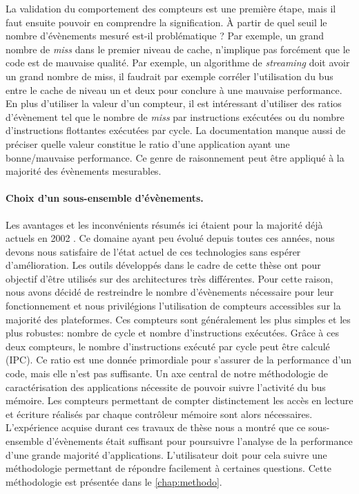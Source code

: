        La validation du comportement des compteurs est une première étape, mais il faut ensuite pouvoir en comprendre la signification. À partir de quel seuil le nombre d'évènements mesuré est-il problématique ? Par exemple, un grand nombre de \textit{miss} dans le premier niveau de cache, n'implique pas forcément que le code est de mauvaise qualité. Par exemple, un algorithme de \textit{streaming} doit avoir un grand nombre de miss, il faudrait par exemple corréler l'utilisation du bus entre le cache de niveau un et deux pour conclure à une mauvaise performance. En plus d'utiliser la valeur d'un compteur, il est intéressant d'utiliser des ratios d'évènement tel que le nombre de \textit{miss} par instructions exécutées ou du nombre d'instructions flottantes exécutées par cycle. La documentation manque aussi de préciser quelle valeur constitue le ratio d'une application ayant une bonne/mauvaise performance. Ce genre de raisonnement peut être appliqué à la majorité des évènements mesurables. 
        
        \paragraph{Choix d'un sous-ensemble d'évènements.} Les avantages et les inconvénients résumés ici étaient pour la majorité déjà actuels en 2002 \cite{sprunt2002basics}. Ce domaine ayant peu évolué depuis toutes ces années, nous devons nous satisfaire de l'état actuel de ces technologies sans espérer d'amélioration. Les outils développés dans le cadre de cette thèse ont pour objectif d'être utilisés sur des architectures très différentes. Pour cette raison, nous avons décidé de restreindre le nombre d'évènements nécessaire pour leur fonctionnement et nous privilégions l'utilisation de compteurs accessibles sur la majorité des plateformes. Ces compteurs sont généralement les plus simples et les plus robustes: nombre de cycle et nombre d'instructions exécutées. Grâce à ces deux compteurs, le nombre d'instructions exécuté par cycle peut être calculé (IPC). Ce ratio est une donnée primordiale pour s'assurer de la performance d'un code, mais elle n'est pas suffisante. Un axe central de notre méthodologie de caractérisation des applications nécessite de pouvoir suivre l'activité du bus mémoire. Les compteurs permettant de compter distinctement les accès en lecture et écriture réalisés par chaque contrôleur mémoire sont alors nécessaires.
        L'expérience acquise durant ces travaux de thèse nous a montré que ce sous-ensemble d'évènements était suffisant pour poursuivre l'analyse de la performance d'une grande majorité d'applications. L'utilisateur doit pour cela suivre une méthodologie permettant de répondre facilement à certaines questions. Cette méthodologie est présentée dans le \autoref{chap:methodo}.
        

